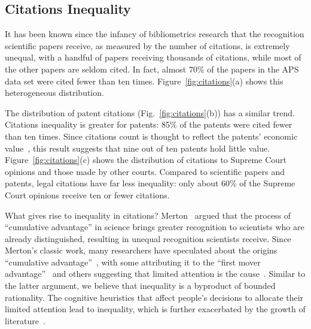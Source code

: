 \documentclass[10pt]{bmc_article}
\newenvironment{bmcformat}{\baselineskip20pt\sloppy\setboolean{publ}{false}}{\baselineskip20pt\sloppy}
\begin{document}
\begin{bmcformat}
\subsection{Citations Inequality}
It has been known since the infancy of bibliometrics research that the recognition scientific papers receive, as measured by the number of citations, is extremely unequal, with a handful of papers receiving thousands of citations, while most of the other papers are seldom cited. In fact, almost 70\% of the papers in the APS data set were cited fewer than ten times. Figure~\ref{fig:citations}(a) shows this heterogeneous distribution.

The distribution of patent citations (Fig.~\ref{fig:citations}(b)) has a similar trend. Citations inequality is greater for patents: 85\% of the patents were cited fewer than ten times. Since citations count is thought to reflect the patents' economic value~\cite{patent-value,patents}, this result suggests that nine out of ten patents hold little value.
Figure~\ref{fig:citations}(c) shows the distribution of citations to Supreme Court opinions and those made by other courts. Compared to scientific papers and patents, legal citations have far less inequality: only about 60\% of the Supreme Court opinions receive ten or fewer citations.

What gives rise to inequality in citations? Merton~\cite{Merton68} argued that the process of ``cumulative advantage'' in science brings greater recognition to scientists who are already distinguished, resulting in unequal recognition scientists receive. Since Merton's classic work, many researchers have speculated about the origins ``cumulative advantage''~\cite{Allison82,Radicchi08unversality,Eom11}, with some attributing it to the ``first mover advantage''~\cite{Newman05} and others suggesting that limited attention is the cause~\cite{Franck99,Klamer02}.
Similar to the latter argument, we believe that inequality is a byproduct of bounded rationality. %
The cognitive heuristics that affect people's decisions to allocate their limited attention lead to inequality, which is further exacerbated by the growth of literature~\cite{Barabasi12}.




\end{bmcformat}
\end{document}
